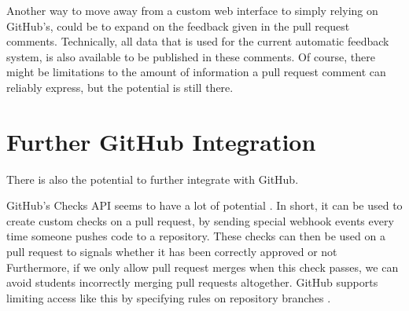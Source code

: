 Another way to move away from a custom web interface to simply relying on GitHub's, could be to expand on the feedback given in the pull request comments.
Technically, all data that is used for the current automatic feedback system, is also available to be published in these comments.
Of course, there might be limitations to the amount of information a pull request comment can reliably express, but the potential is still there.

\section{Further GitHub Integration}

There is also the potential to further integrate with GitHub.

GitHub's Checks API seems to have a lot of potential \cite{checks}.
In short, it can be used to create custom checks on a pull request, by sending special webhook events every time someone pushes code to a repository.
These checks can then be used on a pull request to signals whether it has been correctly approved or not
Furthermore, if we only allow pull request merges when this check passes, we can avoid students incorrectly merging pull requests altogether.
GitHub supports limiting access like this by specifying rules on repository branches \cite{branches}.
